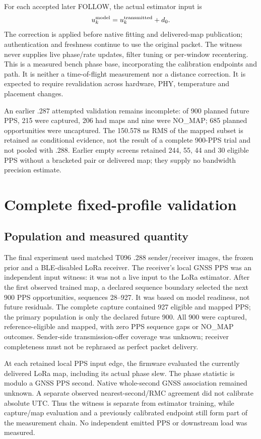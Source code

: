 \documentclass[10pt,letterpaper]{article}
\begin{document}
For each accepted later FOLLOW, the actual estimator input is
\[
 u_k^{\rm model}=u_k^{\rm transmitted}+d_0.
\]
The correction is applied before native fitting and delivered-map publication;
authentication and freshness continue to use the original packet. The witness
never supplies live phase/rate updates, filter tuning or per-window recentering.
This is a measured bench phase base, incorporating the calibration endpoints
and path. It is neither a time-of-flight measurement nor a distance correction.
It is expected to require revalidation across hardware, PHY, temperature and
placement changes.

An earlier .287 attempted validation remains incomplete: of 900 planned future
PPS, 215 were captured, 206 had maps and nine were NO\_MAP; 685 planned
opportunities were uncaptured. The 150.578 ns RMS of the mapped subset is
retained as conditional evidence, not the result of a complete 900-PPS trial
and not pooled with .288. Earlier empty screens retained 244, 55, 44 and 30
eligible PPS without a bracketed pair or delivered map; they supply no
bandwidth precision estimate.
\clearpage

\section{Complete fixed-profile validation}
\subsection{Population and measured quantity}
The final experiment used matched T096 .288 sender/receiver images, the frozen
prior and a BLE-disabled LoRa receiver. The receiver's local GNSS PPS was an
independent input witness: it was not a live input to the LoRa estimator.
After the first observed trained map, a declared sequence boundary selected
the next 900 PPS opportunities, sequences 28--927. It was based on model
readiness, not future residuals. The complete capture contained 927 eligible
and mapped PPS; the primary population is only the declared future 900.
All 900 were captured, reference-eligible and mapped, with zero PPS sequence
gaps or NO\_MAP outcomes. Sender-side transmission-offer coverage was unknown;
receiver completeness must not be rephrased as perfect packet delivery.

At each retained local PPS input edge, the firmware evaluated the currently
delivered LoRa map, including its actual phase slew. The phase statistic is
modulo a GNSS PPS second. Native whole-second GNSS association remained
unknown. A separate observed nearest-second/RMC agreement did not calibrate
absolute UTC. Thus the witness is separate from estimator training, while
capture/map evaluation and a previously calibrated endpoint still form part
of the measurement chain. No independent emitted PPS or downstream load was
measured.
\end{document}
